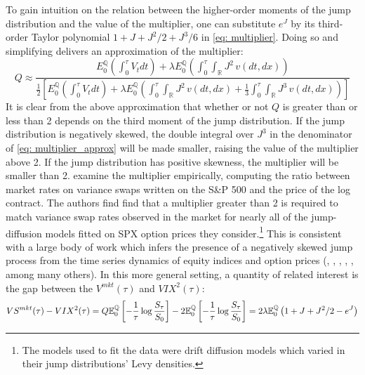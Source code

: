 \documentclass[12pt]{article}
\begin{document}
To gain intuition on the relation between the higher-order moments of the jump distribution and the value of the multiplier, one can substitute $e^J$ by its third-order Taylor polynomial $1 + J + J^2/2 + J^3/6$ in \eqref{eq: multiplier}. Doing so and simplifying delivers an approximation of the multiplier:
\begin{equation}\label{eq: multiplier_approx}
      Q \approx \dfrac{E_0^\mathbb{Q}\left(\int_0^\tau V_t d t \right)+\lambda E_0^\mathbb{Q}\left(\int_0^\tau \int_\mathbb{R} J^2  \,  v(dt, dx)  \right) }{\frac{1}{2}\left[E_0^\mathbb{Q}\left(\int_0^\tau V_t d t \right)+\lambda E_0^\mathbb{Q}\left(\int_0^\tau \int_\mathbb{R} J^2   \,  v(dt, dx)  + \frac{1}{3}\int_0^\tau \int_\mathbb{R}  J^3   \,  v(dt, dx)  \right) \right]}
\end{equation}
It is clear from the above approximation that whether or not $Q$ is greater than or less than 2 depends on the third moment of the jump distribution. If the jump distribution is negatively skewed, the double integral over $J^3$ in the denominator of \eqref{eq: multiplier_approx} will be made smaller, raising the value of the multiplier above 2. If the jump distribution has positive skewness, the multiplier will be smaller than 2. \cite{carr2012variance} examine the multiplier empirically, computing the ratio between market rates on variance swaps written on the S\&P 500 and the price of the log contract. The authors find find that a multiplier greater than 2 is required to match variance swap rates observed in the market for nearly all of the jump-diffusion models fitted on SPX option prices they consider.\footnote{The models used to fit the data were drift diffusion models which varied in their jump distributions' Levy densities.} This is consistent with a large body of work which infers the presence of a negatively skewed jump process from the time series dynamics of equity indices and option prices (\cite{bates2000post}, \cite{pan2002jump}, \cite{eraker2003impact}, \cite{bollerslev2011tails}, \cite{andersen2015risk}, among many others). In this more general setting, a quantity of related interest is the gap between the $V^{mkt}(\tau)$ and $VIX^2(\tau)$:
\begin{equation}{\label{eq: VIX_gap}}
     VS^{mkt}(\tau) - VIX^2(\tau) = Q \mathbb{E}^\mathbb{Q}_0\left[-\dfrac{1}{\tau}\log\dfrac{S_\tau}{S_0}\right] - 2 \mathbb{E}_0^\mathbb{Q}\left[-\dfrac{1}{\tau}\log\dfrac{S_\tau}{S_0}\right] = 2\lambda\mathbb{E}_0^\mathbb{Q}\left(1 + J + J^2/2 - e^J\right)
\end{equation}
\end{document}
